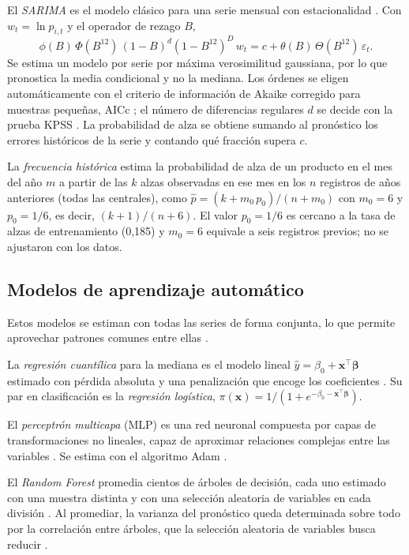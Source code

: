 El \emph{SARIMA} es el modelo clásico para una serie mensual con estacionalidad \citep{box2015}. Con $w_t=\ln p_{i,t}$ y el operador de rezago $B$,
\begin{equation}
\phi(B)\,\Phi(B^{12})\,(1-B)^d(1-B^{12})^D\,w_t=c+\theta(B)\,\Theta(B^{12})\,\varepsilon_t .
\label{eq:sarima}
\end{equation}
Se estima un modelo por serie por máxima verosimilitud gaussiana, por lo que pronostica la media condicional y no la mediana. Los órdenes se eligen automáticamente con el criterio de información de Akaike corregido para muestras pequeñas, AICc \citep{hurvich1989,hyndman2008auto}; el número de diferencias regulares $d$ se decide con la prueba KPSS \citep{kpss1992}. La probabilidad de alza se obtiene sumando al pronóstico los errores históricos de la serie y contando qué fracción supera $c$.

La \emph{frecuencia histórica} estima la probabilidad de alza de un producto en el mes del año $m$ a partir de las $k$ alzas observadas en ese mes en los $n$ registros de años anteriores (todas las centrales), como $\hat p=(k+m_0\,p_0)/(n+m_0)$ con $m_0=6$ y $p_0=1/6$, es decir, $(k+1)/(n+6)$. El valor $p_0=1/6$ es cercano a la tasa de alzas de entrenamiento (0,185) y $m_0=6$ equivale a seis registros previos; no se ajustaron con los datos.

\subsection{Modelos de aprendizaje automático}
\label{sec:modelos}

Estos modelos se estiman con todas las series de forma conjunta, lo que permite aprovechar patrones comunes entre ellas \citep{montero2021}.

La \emph{regresión cuantílica} para la mediana es el modelo lineal $\hat y=\beta_0+\mathbf{x}^\top\boldsymbol\beta$ estimado con pérdida absoluta y una penalización que encoge los coeficientes \citep{koenker1978,tibshirani1996}. Su par en clasificación es la \emph{regresión logística}, $\pi(\mathbf{x})=1/(1+e^{-\beta_0-\mathbf{x}^\top\boldsymbol\beta})$.

El \emph{perceptrón multicapa} (MLP) es una red neuronal compuesta por capas de transformaciones no lineales, capaz de aproximar relaciones complejas entre las variables \citep{hornik1989}. Se estima con el algoritmo Adam \citep{kingma2015}.

El \emph{Random Forest} promedia cientos de árboles de decisión, cada uno estimado con una muestra distinta y con una selección aleatoria de variables en cada división \citep{breiman2001}. Al promediar, la varianza del pronóstico queda determinada sobre todo por la correlación entre árboles, que la selección aleatoria de variables busca reducir \citep[cap.~15]{esl2009}.


